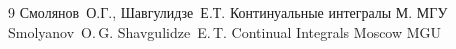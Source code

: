\begin{thebibliography}{9}
\by Смолянов~О.Г., Шавгулидзе~Е.Т.
\book Континуальные интегралы
\publaddr  М.
\publ МГУ
\misctransl
\by  Smolyanov~O.\,G.  Shavgulidze~E.\,T.
\book Continual Integrals
\publaddr  Moscow
\publ MGU


% 
% 
%
%
%
%
%
%
%
%
%
%
%
%
%
%
%
%






 \end{thebibliography}
 
